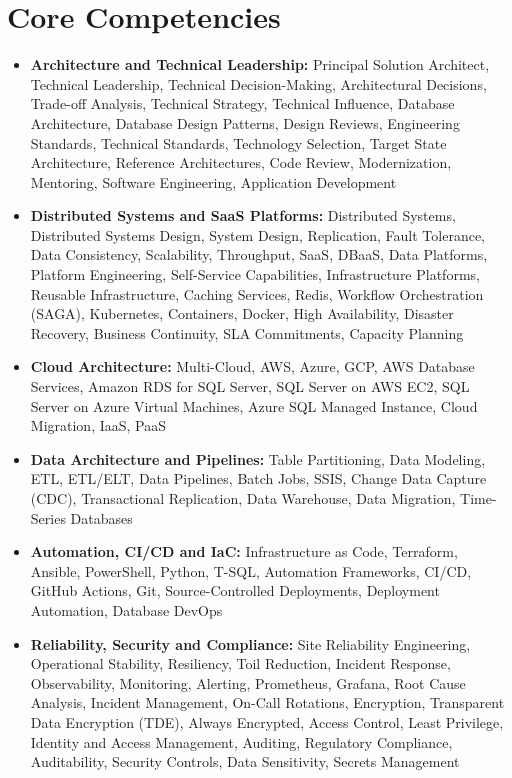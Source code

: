 \documentclass[10pt,a4paper]{article}
\begin{document}
\section{Core Competencies}
\begin{itemize}
  \item \textbf{Architecture and Technical Leadership:} Principal Solution Architect, Technical Leadership, Technical Decision-Making, Architectural Decisions, Trade-off Analysis, Technical Strategy, Technical Influence, Database Architecture, Database Design Patterns, Design Reviews, Engineering Standards, Technical Standards, Technology Selection, Target State Architecture, Reference Architectures, Code Review, Modernization, Mentoring, Software Engineering, Application Development
  \item \textbf{Distributed Systems and SaaS Platforms:} Distributed Systems, Distributed Systems Design, System Design, Replication, Fault Tolerance, Data Consistency, Scalability, Throughput, SaaS, DBaaS, Data Platforms, Platform Engineering, Self-Service Capabilities, Infrastructure Platforms, Reusable Infrastructure, Caching Services, Redis, Workflow Orchestration (SAGA), Kubernetes, Containers, Docker, High Availability, Disaster Recovery, Business Continuity, SLA Commitments, Capacity Planning
  \item \textbf{Cloud Architecture:} Multi-Cloud, AWS, Azure, GCP, AWS Database Services, Amazon RDS for SQL Server, SQL Server on AWS EC2, SQL Server on Azure Virtual Machines, Azure SQL Managed Instance, Cloud Migration, IaaS, PaaS
  \item \textbf{Data Architecture and Pipelines:} Table Partitioning, Data Modeling, ETL, ETL/ELT, Data Pipelines, Batch Jobs, SSIS, Change Data Capture (CDC), Transactional Replication, Data Warehouse, Data Migration, Time-Series Databases
  \item \textbf{Automation, CI/CD and IaC:} Infrastructure as Code, Terraform, Ansible, PowerShell, Python, T-SQL, Automation Frameworks, CI/CD, GitHub Actions, Git, Source-Controlled Deployments, Deployment Automation, Database DevOps
  \item \textbf{Reliability, Security and Compliance:} Site Reliability Engineering, Operational Stability, Resiliency, Toil Reduction, Incident Response, Observability, Monitoring, Alerting, Prometheus, Grafana, Root Cause Analysis, Incident Management, On-Call Rotations, Encryption, Transparent Data Encryption (TDE), Always Encrypted, Access Control, Least Privilege, Identity and Access Management, Auditing, Regulatory Compliance, Auditability, Security Controls, Data Sensitivity, Secrets Management

\end{itemize}
\end{document}
